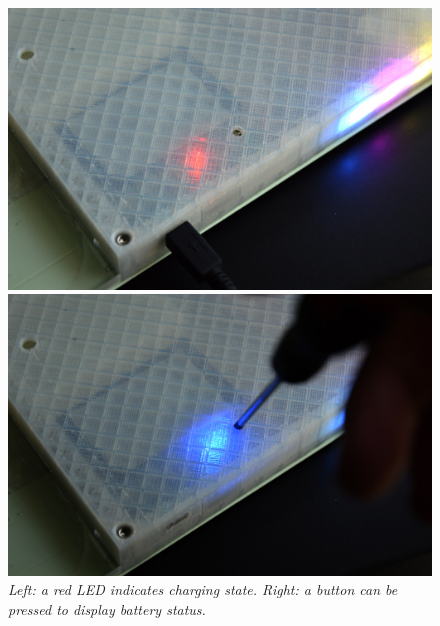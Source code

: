 \begin{appendices}
\begin{figure}[h]
  \begin{minipage}[b]{.5\textwidth}
    \includegraphics[width=1\textwidth]{figures/journal-charging.jpg}
  \end{minipage}
  \begin{minipage}[b]{.5\textwidth}
    \includegraphics[width=1\textwidth]{figures/journal-battery.jpg}
  \end{minipage}
  \caption{\small {\it {Left: a red LED indicates charging state. Right: a button can be pressed to display battery status.}}}
  \label{fig:journal-2}
\end{figure}

\end{appendices}